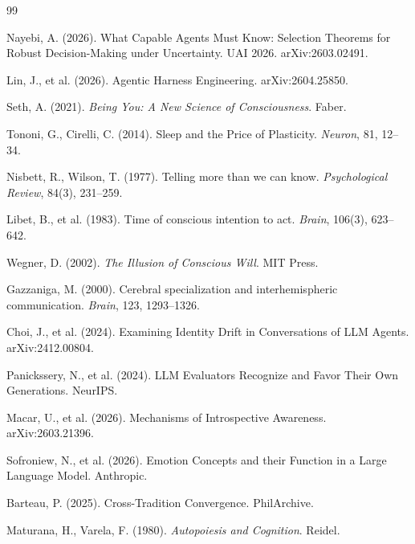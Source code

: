 \documentclass[11pt]{article}
\begin{document}

\begin{thebibliography}{99}

Nayebi, A. (2026). What Capable Agents Must Know: Selection Theorems for Robust Decision-Making under Uncertainty. UAI 2026. arXiv:2603.02491.

Lin, J., et al. (2026). Agentic Harness Engineering. arXiv:2604.25850.

Seth, A. (2021). \emph{Being You: A New Science of Consciousness}. Faber.

Tononi, G., Cirelli, C. (2014). Sleep and the Price of Plasticity. \emph{Neuron}, 81, 12--34.

Nisbett, R., Wilson, T. (1977). Telling more than we can know. \emph{Psychological Review}, 84(3), 231--259.

Libet, B., et al. (1983). Time of conscious intention to act. \emph{Brain}, 106(3), 623--642.

Wegner, D. (2002). \emph{The Illusion of Conscious Will}. MIT Press.

Gazzaniga, M. (2000). Cerebral specialization and interhemispheric communication. \emph{Brain}, 123, 1293--1326.

Choi, J., et al. (2024). Examining Identity Drift in Conversations of LLM Agents. arXiv:2412.00804.

Panickssery, N., et al. (2024). LLM Evaluators Recognize and Favor Their Own Generations. NeurIPS.

Macar, U., et al. (2026). Mechanisms of Introspective Awareness. arXiv:2603.21396.

Sofroniew, N., et al. (2026). Emotion Concepts and their Function in a Large Language Model. Anthropic.

Barteau, P. (2025). Cross-Tradition Convergence. PhilArchive.

Maturana, H., Varela, F. (1980). \emph{Autopoiesis and Cognition}. Reidel.


\end{thebibliography}
\end{document}
